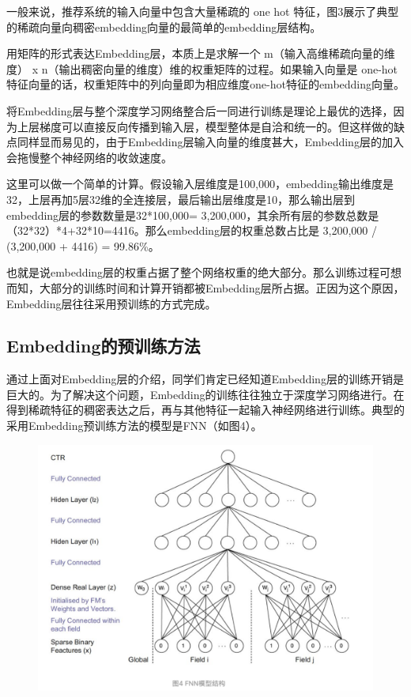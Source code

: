 \documentclass[12pt]{article}
\begin{document}
一般来说，推荐系统的输入向量中包含大量稀疏的 one hot 特征，图3展示了典型的稀疏向量向稠密embedding向量的最简单的embedding层结构。

用矩阵的形式表达Embedding层，本质上是求解一个 m（输入高维稀疏向量的维度） x n（输出稠密向量的维度）维的权重矩阵的过程。如果输入向量是 one-hot 特征向量的话，权重矩阵中的列向量即为相应维度one-hot特征的embedding向量。

将Embedding层与整个深度学习网络整合后一同进行训练是理论上最优的选择，因为上层梯度可以直接反向传播到输入层，模型整体是自洽和统一的。但这样做的缺点同样显而易见的，由于Embedding层输入向量的维度甚大，Embedding层的加入会拖慢整个神经网络的收敛速度。

\begin{framed}
这里可以做一个简单的计算。假设输入层维度是100,000，embedding输出维度是32，上层再加5层32维的全连接层，最后输出层维度是10，那么输出层到embedding层的参数数量是32*100,000= 3,200,000，其余所有层的参数总数是 （32*32）*4+32*10=4416。那么embedding层的权重总数占比是 3,200,000 / (3,200,000 + 4416) = 99.86\%。
\end{framed}

也就是说embedding层的权重占据了整个网络权重的绝大部分。那么训练过程可想而知，大部分的训练时间和计算开销都被Embedding层所占据。正因为这个原因，Embedding层往往采用预训练的方式完成。

\subsection{Embedding的预训练方法}
通过上面对Embedding层的介绍，同学们肯定已经知道Embedding层的训练开销是巨大的。为了解决这个问题，Embedding的训练往往独立于深度学习网络进行。在得到稀疏特征的稠密表达之后，再与其他特征一起输入神经网络进行训练。典型的采用Embedding预训练方法的模型是FNN（如图4）。
\begin{figure}[H]
    \centering
    \includegraphics[width=.8\textwidth]{fig/FNN_Structure.png}
\end{figure}
\end{document}
